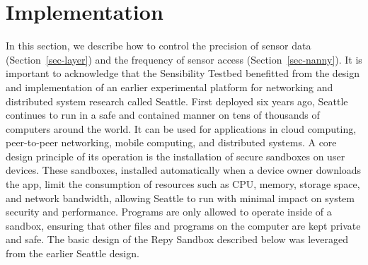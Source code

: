 \section{Implementation}\label{sec-policy}
In this section, we describe how to control the precision of sensor data (Section~\ref{sec-layer}) 
and the frequency of sensor access (Section~\ref{sec-nanny}). 
It is important to acknowledge that the Sensibility Testbed 
benefitted from the design and implementation of an earlier experimental 
platform for networking and distributed system research called Seattle. 
First deployed six years ago, Seattle continues to run in a safe and 
contained manner on tens of thousands of computers around the world. It 
can be used for applications in cloud computing, peer-to-peer networking, 
mobile computing, and distributed systems. A core design principle of its 
operation is the installation of secure sandboxes on user devices. These 
sandboxes, installed automatically when a device owner downloads the app, 
limit the consumption of resources such as CPU, memory, storage space, and 
network bandwidth, allowing Seattle to run with minimal impact on system 
security and performance. Programs are only allowed to operate inside of a 
sandbox, ensuring that other files and programs on the computer are kept 
private and safe. The basic design of the Repy Sandbox described below was 
leveraged from the earlier Seattle design. 

